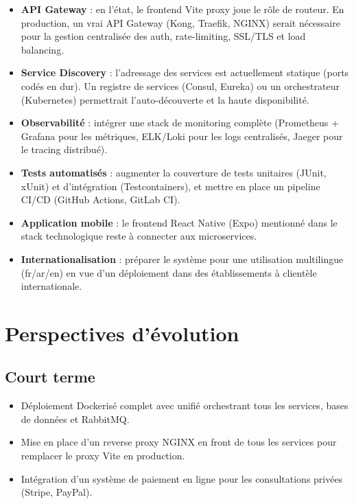 \begin{infobox}
\begin{itemize}[itemsep=4pt]
  \item \textbf{API Gateway} : en l'état, le frontend Vite proxy joue le rôle
    de routeur. En production, un vrai API Gateway (Kong, Traefik, NGINX) serait
    nécessaire pour la gestion centralisée des auth, rate-limiting, SSL/TLS et
    load balancing.

  \item \textbf{Service Discovery} : l'adressage des services est actuellement
    statique (ports codés en dur). Un registre de services (Consul, Eureka) ou
    un orchestrateur (Kubernetes) permettrait l'auto-découverte et la
    haute disponibilité.

  \item \textbf{Observabilité} : intégrer une stack de monitoring complète
    (Prometheus + Grafana pour les métriques, ELK/Loki pour les logs centralisés,
    Jaeger pour le tracing distribué).

  \item \textbf{Tests automatisés} : augmenter la couverture de tests unitaires
    (JUnit, xUnit) et d'intégration (Testcontainers), et mettre en place un
    pipeline CI/CD (GitHub Actions, GitLab CI).

  \item \textbf{Application mobile} : le frontend React Native (Expo) mentionné
    dans le stack technologique reste à connecter aux microservices.

  \item \textbf{Internationalisation} : préparer le système pour une utilisation
    multilingue (fr/ar/en) en vue d'un déploiement dans des établissements à
    clientèle internationale.
\end{itemize}
\end{infobox}

\section{Perspectives d'évolution}

\subsection{Court terme}

\begin{itemize}[itemsep=4pt]
  \item Déploiement Dockerisé complet avec  unifié
    orchestrant tous les services, bases de données et RabbitMQ.
  \item Mise en place d'un reverse proxy NGINX en front de tous les services
    pour remplacer le proxy Vite en production.
  \item Intégration d'un système de paiement en ligne pour les consultations
    privées (Stripe, PayPal).
\end{itemize}


